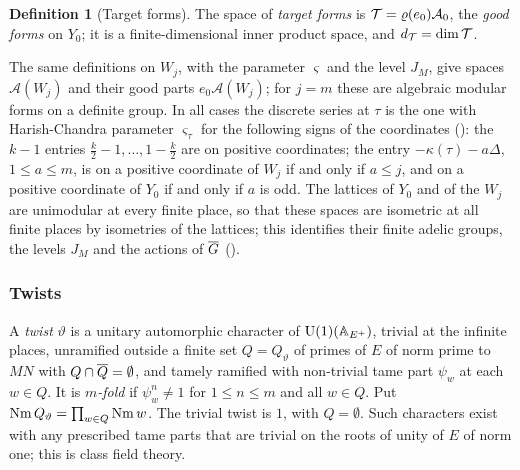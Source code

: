 \documentclass[10pt]{amsart}
\theoremstyle{definition}
\newtheorem{definition}[theorem]{Definition}
\theoremstyle{remark}
\begin{document}
\begin{definition}[Target forms]\label{def:au-target}
The space of \emph{target forms} is $\mathcal T=\varrho(e_0)\mathcal A_0$, the \emph{good forms} on $Y_0$; it
is a finite-dimensional inner product space, and $d_{\mathcal T}=\dim\mathcal T$.
\end{definition}

The same definitions on $W_j$, with the parameter $\varsigma$ and the level $J_M$, give spaces
$\mathcal A(W_j)$ and their good parts $e_0\mathcal A(W_j)$; for $j=m$ these are algebraic modular
forms on a definite group. In all cases the discrete series at $\tau$ is the one with
Harish-Chandra parameter $\varsigma_\tau$ for the following signs of the coordinates
({\cite[(43)]{P51}}): the $k-1$ entries $\tfrac k2-1,\dots,1-\tfrac k2$ are on positive
coordinates; the entry $-\kappa(\tau)-a\Delta$, $1\le a\le m$, is on a positive coordinate of $W_j$
if and only if $a\le j$, and on a positive coordinate of $Y_0$ if and only if $a$ is odd. The
lattices of $Y_0$ and of the $W_j$ are unimodular at every finite place, so that these spaces are
isometric at all finite places by isometries of the lattices; this identifies their finite adelic
groups, the levels $J_M$ and the actions of $\overline G$ ({\cite[\S4.1.8]{P51}}).

\subsubsection*{Twists}
A \emph{twist} $\vartheta$ is a unitary automorphic character of $\mathrm U(1)(\mathbb A_{E^+})$, trivial at
the infinite places, unramified outside a finite set $Q=Q_\vartheta$ of primes of $E$ of norm
prime to $MN$ with $Q\cap\overline{Q}=\emptyset$, and tamely ramified with non-trivial tame part
$\psi_w$ at each $w\in Q$. It is \emph{$m$-fold} if $\psi_w^n\ne1$ for $1\le n\le m$ and all
$w\in Q$. Put $\operatorname{Nm} Q_\vartheta=\prod_{w\in Q}\operatorname{Nm} w$. The trivial twist is $1$, with
$Q=\emptyset$. Such characters exist with any prescribed tame parts that are trivial on the roots
of unity of $E$ of norm one; this is class field theory.
\end{document}
